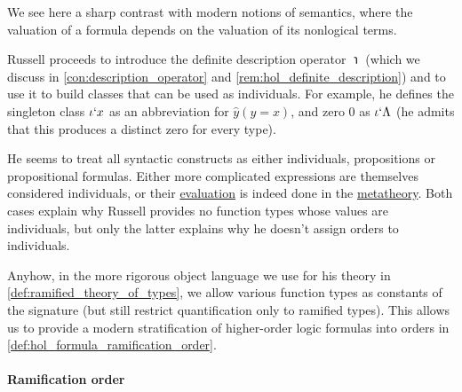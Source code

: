 \begin{remark}
\begin{thmenum}
    We see here a sharp contrast with modern notions of semantics, where the valuation of a formula depends on the valuation of its nonlogical terms.

    Russell proceeds to introduce the definite description operator \( \turnediota \) (which we discuss in \cref{con:description_operator} and \cref{rem:hol_definite_description}) and to use it to build classes that can be used as individuals. For example, he defines the singleton class \( \iota\text{\lq} x \) as an abbreviation for \( \hat y (y = x) \), and zero \( 0 \) as \( \iota\text{\lq} \Lambda \) (he admits that this produces a distinct zero for every type).

    He seems to treat all syntactic constructs as either individuals, propositions or propositional formulas. Either more complicated expressions are themselves considered individuals, or their \hyperref[con:evaluation]{evaluation} is indeed done in the \hyperref[con:metalogic]{metatheory}. Both cases explain why Russell provides no function types whose values are individuals, but only the latter explains why he doesn't assign orders to individuals.

    Anyhow, in the more rigorous object language we use for his theory in \cref{def:ramified_theory_of_types}, we allow various function types as constants of the signature (but still restrict quantification only to ramified types). This allows us to provide a modern stratification of higher-order logic formulas into orders in \cref{def:hol_formula_ramification_order}.
  \end{thmenum}
\end{remark}

\paragraph{Ramification order}

